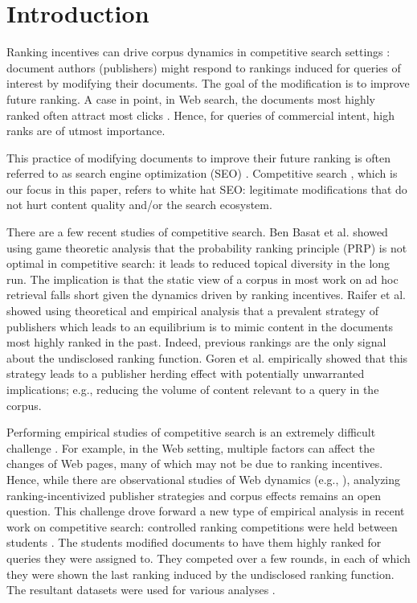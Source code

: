 \section{Introduction}
Ranking incentives can drive corpus dynamics in competitive search
settings \cite{kurland_competitive_2022}: document authors
(publishers) might respond to rankings induced for queries of interest
by modifying their documents. The goal of the modification is to
improve future ranking. A case in point, in Web search, the documents most highly ranked often attract most clicks \cite{Joachims+al:05a}. Hence, for queries of commercial intent, high ranks are of utmost importance.


This practice of modifying documents to improve their future ranking
is often referred to as search engine optimization (SEO)
\cite{Gyongyi+Molina:05a}. Competitive search
\cite{kurland_competitive_2022}, which is our focus in this paper, refers
to white hat SEO: legitimate modifications that do not hurt content
quality and/or the search ecosystem.

There are a few recent studies of competitive search. Ben Basat et
al. \cite{Basat+al:17a} showed using game theoretic analysis that the
probability ranking principle (PRP) \cite{Robertson:77a} is not
optimal in competitive search: it leads to reduced topical diversity
in the long run. The implication is that the static view of a
corpus in most work on ad hoc retrieval falls short given the dynamics
driven by ranking incentives. Raifer et
al. \cite{raifer_information_2017} showed using theoretical and
empirical analysis that a prevalent strategy of publishers which leads to an equilibrium is to mimic
content in the documents most highly ranked in the past. Indeed, previous rankings are the only signal about the undisclosed ranking function.
Goren et
al. \cite{goren_driving_2021} empirically showed that this strategy
leads to a publisher herding effect with potentially unwarranted implications; e.g., reducing the volume of content relevant to a query in the corpus.

Performing empirical studies of competitive search is an extremely
difficult challenge \cite{kurland_competitive_2022}. For example, in
the Web setting, multiple factors can affect the changes of Web pages,
many of which may not be due to ranking incentives. Hence, while there
are observational studies of Web dynamics (e.g.,
\cite{Radinski+al:13a}), analyzing ranking-incentivized publisher
strategies and corpus effects remains an open question. This challenge
drove forward a new type of empirical analysis in recent work on
competitive search: controlled ranking competitions were held between
students
\cite{raifer_information_2017,goren_ranking-incentivized_2020,goren_driving_2021,nachimovsky_ranking-incentivized_2024}. The
students modified documents to have them highly ranked for queries
they were assigned to. They competed over a few rounds, in each of
which they were shown the last ranking induced by the undisclosed
ranking function. The resultant datasets were used for various
analyses
\cite{raifer_information_2017, goren_ranking-incentivized_2020, goren_driving_2021,Wu+al:23a,nachimovsky_ranking-incentivized_2024}.

